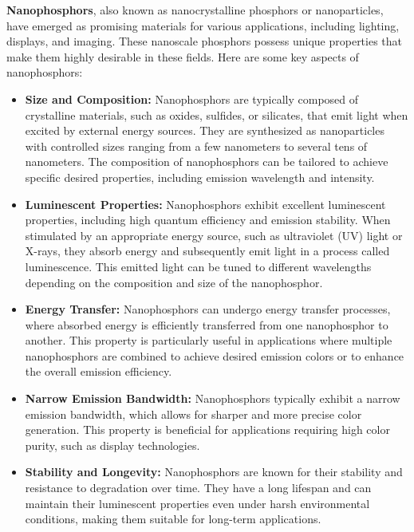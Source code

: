 \documentclass[../../Report.tex]{subfiles}
\begin{document}
    \textbf{Nanophosphors}, also known as nanocrystalline phosphors or nanoparticles, have emerged as 
    promising materials for various applications, including lighting, displays, and imaging. 
    These nanoscale phosphors possess unique properties that make them highly desirable in 
    these fields. Here are some key aspects of nanophosphors\cite{b8}:

    \begin{itemize}
        \item \textbf{Size and Composition: } Nanophosphors are typically composed of crystalline materials, 
        such as oxides, sulfides, or silicates, that emit light when excited by external energy sources. 
        They are synthesized as nanoparticles with controlled sizes ranging from a few nanometers to several 
        tens of nanometers. The composition of nanophosphors can be tailored to achieve specific desired 
        properties, including emission wavelength and intensity.

        \item \textbf{Luminescent Properties: } Nanophosphors exhibit excellent luminescent properties, 
        including high quantum efficiency and emission stability. When stimulated by an appropriate energy 
        source, such as ultraviolet (UV) light or X-rays, they absorb energy and subsequently emit light in a 
        process called luminescence. This emitted light can be tuned to different wavelengths depending on the 
        composition and size of the nanophosphor.

        \item \textbf{Energy Transfer:} Nanophosphors can undergo energy transfer processes, where absorbed 
        energy is efficiently transferred from one nanophosphor to another. This property is particularly 
        useful in applications where multiple nanophosphors are combined to achieve desired emission colors 
        or to enhance the overall emission efficiency.

        \item \textbf{Narrow Emission Bandwidth: } Nanophosphors typically exhibit a narrow emission 
        bandwidth, which allows for sharper and more precise color generation. This property is beneficial 
        for applications requiring high color purity, such as display technologies.

        \item \textbf{Stability and Longevity: } Nanophosphors are known for their stability and resistance 
        to degradation over time. They have a long lifespan and can maintain their luminescent properties 
        even under harsh environmental conditions, making them suitable for long-term applications.


\end{itemize}
\end{document}
